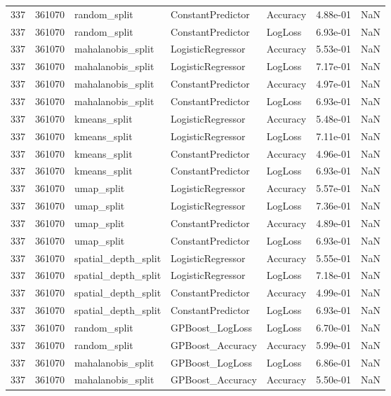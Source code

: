 \begin{tabular}{rrlllrr}
337 & 361070 & random\_split & ConstantPredictor & Accuracy & 4.88e-01 & NaN \\
337 & 361070 & random\_split & ConstantPredictor & LogLoss & 6.93e-01 & NaN \\
337 & 361070 & mahalanobis\_split & LogisticRegressor & Accuracy & 5.53e-01 & NaN \\
337 & 361070 & mahalanobis\_split & LogisticRegressor & LogLoss & 7.17e-01 & NaN \\
337 & 361070 & mahalanobis\_split & ConstantPredictor & Accuracy & 4.97e-01 & NaN \\
337 & 361070 & mahalanobis\_split & ConstantPredictor & LogLoss & 6.93e-01 & NaN \\
337 & 361070 & kmeans\_split & LogisticRegressor & Accuracy & 5.48e-01 & NaN \\
337 & 361070 & kmeans\_split & LogisticRegressor & LogLoss & 7.11e-01 & NaN \\
337 & 361070 & kmeans\_split & ConstantPredictor & Accuracy & 4.96e-01 & NaN \\
337 & 361070 & kmeans\_split & ConstantPredictor & LogLoss & 6.93e-01 & NaN \\
337 & 361070 & umap\_split & LogisticRegressor & Accuracy & 5.57e-01 & NaN \\
337 & 361070 & umap\_split & LogisticRegressor & LogLoss & 7.36e-01 & NaN \\
337 & 361070 & umap\_split & ConstantPredictor & Accuracy & 4.89e-01 & NaN \\
337 & 361070 & umap\_split & ConstantPredictor & LogLoss & 6.93e-01 & NaN \\
337 & 361070 & spatial\_depth\_split & LogisticRegressor & Accuracy & 5.55e-01 & NaN \\
337 & 361070 & spatial\_depth\_split & LogisticRegressor & LogLoss & 7.18e-01 & NaN \\
337 & 361070 & spatial\_depth\_split & ConstantPredictor & Accuracy & 4.99e-01 & NaN \\
337 & 361070 & spatial\_depth\_split & ConstantPredictor & LogLoss & 6.93e-01 & NaN \\
337 & 361070 & random\_split & GPBoost\_LogLoss & LogLoss & 6.70e-01 & NaN \\
337 & 361070 & random\_split & GPBoost\_Accuracy & Accuracy & 5.99e-01 & NaN \\
337 & 361070 & mahalanobis\_split & GPBoost\_LogLoss & LogLoss & 6.86e-01 & NaN \\
337 & 361070 & mahalanobis\_split & GPBoost\_Accuracy & Accuracy & 5.50e-01 & NaN \\

\end{tabular}
